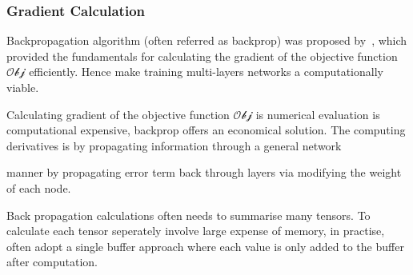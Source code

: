 \subsubsection{Gradient Calculation}
Backpropagation algorithm (often referred as backprop) was proposed by~\citet{werbos1975beyond}, which provided the fundamentals for calculating the gradient of the objective function $\mathcal{Obj}$ efficiently. Hence make training multi-layers networks a computationally viable. 
\par
Calculating gradient of the objective function $\mathcal{Obj}$ is numerical evaluation is computational expensive, backprop offers an economical solution. The computing derivatives is by propagating information through a general network 

manner by propagating error term back through layers via modifying the weight of each node. 
\par 
Back propagation calculations often needs to summarise many tensors. To calculate each tensor seperately involve large expense of memory, in practise, often adopt a single buffer approach where each value is only added to the buffer after computation.